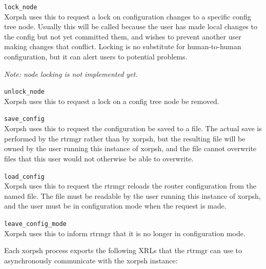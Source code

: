 \documentclass[11pt]{article}
\begin{document}
\begin{description}
  \item{\tt lock\_node} \\Xorpsh uses this to request a lock on
  configuration changes to a specific config tree node.  Usually this
  will be called because the user has made local changes to the config
  but not yet committed them, and wishes to prevent another user making
  changes that conflict.  Locking is no substitute for human-to-human
  configuration, but it can alert users to potential problems.

  {\it Note: node locking is not implemented yet.}

  \item{\tt unlock\_node} \\Xorpsh uses this to request a lock on a
  config tree node be removed.

  \item{\tt save\_config} \\Xorpsh uses this to request the
  configuration be saved to a file.  The actual save is performed by the
  rtrmgr rather than by xorpsh, but the resulting file will be owned by
  the user running this instance of xorpsh, and the file cannot
  overwrite files that this user would not otherwise be able to
  overwrite.

  \item{\tt load\_config} \\Xorpsh uses this to request the rtrmgr reloads
  the router configuration from the named file.  The file must be
  readable by the user running this instance of xorpsh, and the user
  must be in configuration mode when the request is made.

  \item{\tt leave\_config\_mode} \\Xorpsh uses this to inform rtrmgr that
  it is no longer in configuration mode.

\end{description}

\vspace{0.2in}
Each xorpsh process exports the following XRLs that the rtrmgr can use
to asynchronously communicate with the xorpsh instance:
\end{document}
